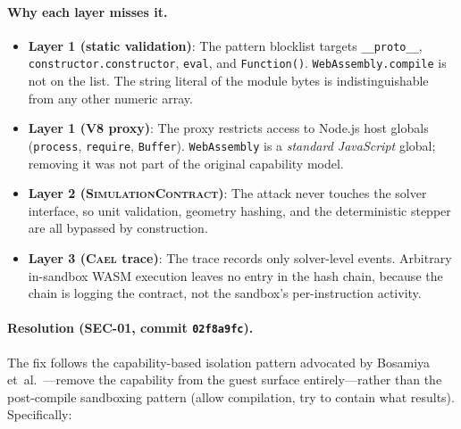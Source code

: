 \documentclass[letterpaper,twocolumn,10pt]{article}
\newcommand{\cael}{\textsc{Cael}}
\newcommand{\simcontract}{\textsc{SimulationContract}}
\begin{document}
\paragraph{Why each layer misses it.}
\begin{itemize}[leftmargin=*,topsep=2pt,itemsep=1pt]
  \item \textbf{Layer 1 (static validation)}: The pattern blocklist
    targets \texttt{\_\_proto\_\_}, \texttt{constructor.constructor},
    \texttt{eval}, and \texttt{Function()}. \texttt{WebAssembly.compile}
    is not on the list. The string literal of the module bytes is
    indistinguishable from any other numeric array.
  \item \textbf{Layer 1 (V8 proxy)}: The proxy restricts access to
    Node.js host globals (\texttt{process}, \texttt{require},
    \texttt{Buffer}). \texttt{WebAssembly} is a \emph{standard
    JavaScript} global; removing it was not part of the original
    capability model.
  \item \textbf{Layer 2 (\simcontract{})}: The attack never touches
    the solver interface, so unit validation, geometry hashing, and
    the deterministic stepper are all bypassed by construction.
  \item \textbf{Layer 3 (\cael{} trace)}: The trace records only
    solver-level events. Arbitrary in-sandbox WASM execution leaves
    no entry in the hash chain, because the chain is logging the
    contract, not the sandbox's per-instruction activity.
\end{itemize}

\paragraph{Resolution (SEC-01, commit \texttt{02f8a9fc}).} The fix
follows the capability-based isolation pattern advocated by Bosamiya
et~al.~\cite{cao2022wasmsandbox}---remove the capability from the guest
surface entirely---rather than the post-compile sandboxing pattern
(allow compilation, try to contain what results). Specifically:
\end{document}
